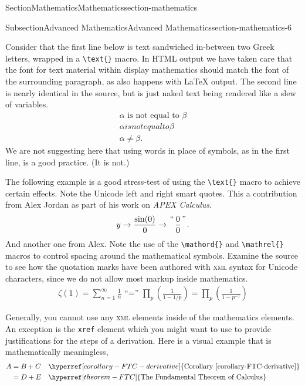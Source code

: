\documentclass[twoside,10pt,]{article}
\newcommand{\xreffont}{\relax}
\newcommand{\mono}[1]{\texttt{#1}}
\newcommand{\initialism}[1]{\textsc{\MakeLowercase{#1}}}
\newcommand{\pubtitle}[1]{\textsl{#1}}
\numberwithin{equation}{section}
\begin{document}
\begin{sectionptx}{Section}{Mathematics}{}{Mathematics}{}{}{section-mathematics}
\begin{subsectionptx}{Subsection}{Advanced Mathematics}{}{Advanced Mathematics}{}{}{section-mathematics-6}
\par
Consider that the first line below is text sandwiched in-between two Greek letters, wrapped in a \mono{\textbackslash{}text\{\}} macro.  In HTML output we have taken care that the font for text material within display mathematics should match the font of the  surrounding paragraph, as also happens with \LaTeX{} output.  The second line is nearly identical in the source, but is just naked text being rendered like a slew of variables.%
\begin{gather*}
\alpha\text{ is not equal to }\beta\\
\alpha is not equal to \beta\\
\alpha\neq\beta\text{.}
\end{gather*}
We are not suggesting here that using words in place of symbols, as in the first line, is a good practice.  (It is not.)%
\par
The following example is a good stress-test of using the \mono{\textbackslash{}text\{\}} macro to achieve certain effects.  Note the Unicode left and right smart quotes.  This a contribution from Alex Jordan as part of his work on \pubtitle{APEX Calculus}.%
\begin{gather*}
y \rightarrow \frac{\sin(0) }{0} \rightarrow {{\text{“}}\atop{}}\frac{0}{0}{{\text{”}}\atop{}}\text{.}
\end{gather*}
And another one from Alex.  Note the use of the \mono{\textbackslash{}mathord\{\}} and \mono{\textbackslash{}mathrel\{\}} macros to control spacing around the mathematical symbols.  Examine the source to see how the quotation marks have been authored with \initialism{XML} syntax for Unicode characters, since we do not allow most markup inside mathematics.%
\begin{gather*}
\zeta(1)=\sum_{n=1}^{\infty}\frac{1}{n}\mathrel{\text{ “}\mathord{=}{\text{” }}}\prod_{p}\left(\frac{1}{1-1/p}\right)=\prod_{p}\left(\frac{1}{1-p^{-1}}\right)
\end{gather*}
%
\par
Generally, you cannot use any \initialism{XML} elements inside of the mathematics elements.  An exception is the \mono{xref} element which you might want to use to provide justifications for the steps of a derivation.  Here is a visual example that is mathematically meaningless,%
\begin{align*}
A&=B+C&&\hyperref[corollary-FTC-derivative]{\text{Corollary {\xreffont\ref{corollary-FTC-derivative}}}}\\
&=D+E&&\hyperref[theorem-FTC]{\text{The Fundamental Theorem of Calculus}}\\

\end{align*}
\end{subsectionptx}
\end{sectionptx}
\end{document}

